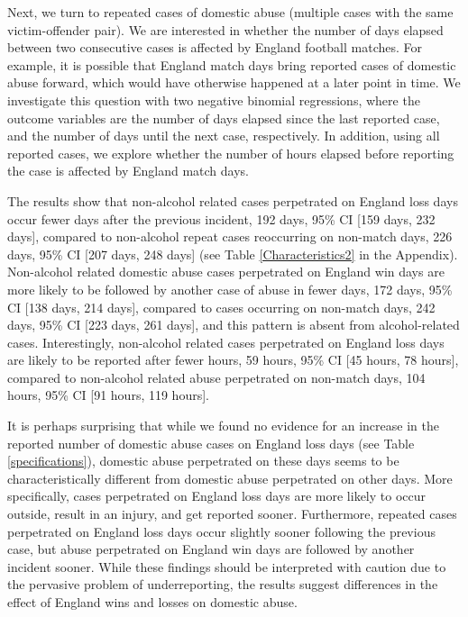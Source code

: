 \documentclass[12pt, letterpaper]{article}
\begin{document}
Next, we turn to repeated cases of domestic abuse (multiple cases with the same victim-offender pair). We are interested in whether the number of days elapsed between two consecutive cases is affected by England football matches. For example, it is possible that England match days bring reported cases of domestic abuse forward, which would have otherwise happened at a later point in time. We investigate this question with two negative binomial regressions, where the outcome variables are the number of days elapsed since the last reported case, and the number of days until the next case, respectively. In addition, using all reported cases, we explore whether the number of hours elapsed before reporting the case is affected by England match days. 

The results show that non-alcohol related cases perpetrated on England loss days occur fewer days after the previous incident, 192 days, 95\% CI [159 days, 232 days], compared to non-alcohol repeat cases reoccurring on non-match days, 226 days, 95\% CI [207 days, 248 days] (see Table \ref{Characteristics2} in the Appendix). Non-alcohol related domestic abuse cases perpetrated on England win days are more likely to be followed by another case of abuse in fewer days, 172 days, 95\% CI [138 days, 214 days], compared to cases occurring on non-match days, 242 days, 95\% CI [223 days, 261 days], and this pattern is absent from alcohol-related cases. Interestingly, non-alcohol related cases perpetrated on England loss days are likely to be reported after fewer hours, 59 hours, 95\% CI [45 hours, 78 hours], compared to non-alcohol related abuse perpetrated on non-match days, 104 hours, 95\% CI [91 hours, 119 hours]. 


It is perhaps surprising that while we found no evidence for an increase in the reported number of domestic abuse cases on England loss days (see Table \ref{specifications}), domestic abuse perpetrated on these days seems to be characteristically different from domestic abuse perpetrated on other days. More specifically, cases perpetrated on England loss days are more likely to occur outside, result in an injury, and get reported sooner. Furthermore, repeated cases perpetrated on England loss days occur slightly sooner following the previous case, but abuse perpetrated on England win days are followed by another incident sooner. While these findings should be interpreted with caution due to the pervasive problem of underreporting, the results suggest differences in the effect of England wins and losses on domestic abuse.
\end{document}
